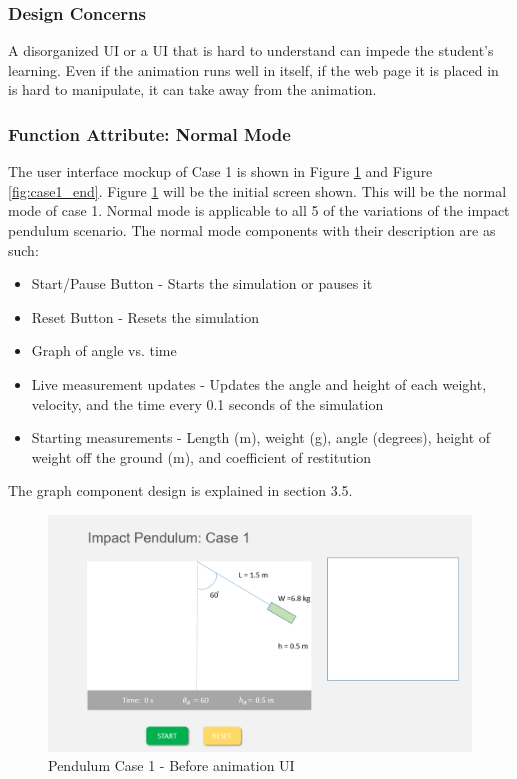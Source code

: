 \documentclass[onecolumn, draftclsnofoot,10pt, compsoc]{IEEEtran}
\begin{document}
\subsubsection{Design Concerns}
A disorganized UI or a UI that is hard to understand can impede the student's learning. Even if the animation runs well in itself, if the web page it is placed in is hard to manipulate, it can take away from the animation. 

\subsubsection{Function Attribute: Normal Mode}
The user interface mockup of Case 1 is shown in Figure \ref{fig:case1_start} and Figure \ref{fig:case1_end}. Figure \ref{fig:case1_start} will be the initial screen shown. This will be the normal mode of case 1. Normal mode is applicable to all 5 of the variations of the impact pendulum scenario. 
The normal mode components with their description are as such:
\begin{itemize}
    \item Start/Pause Button - Starts the simulation or pauses it 
    \item Reset Button - Resets the simulation
    \item Graph of angle vs. time 
    \item Live measurement updates  - Updates the angle and height of each weight, velocity, and the time every 0.1 seconds of the simulation
    \item Starting measurements  - Length (m), weight (g), angle (degrees), height of weight off the ground (m), and coefficient of restitution 
\end{itemize}

The graph component design is explained in section 3.5. \newline


\begin{figure}[H]
  \includegraphics[width=5.5 in]{pendulum_case_1_1.png}
  \caption{Pendulum Case 1 - Before animation UI}
  \label{fig:case1_start}
\end{figure}
 
\end{document}

